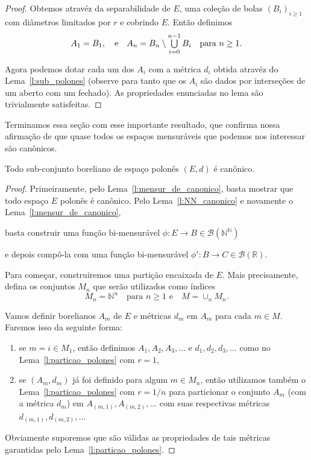 \begin{topics}
\begin{proof}
  Obtemos atravéz da separabilidade de $E$, uma coleção de bolas $(B_i)_{i \geq 1}$ com diâmetros limitados por $r$ e cobrindo $E$.
  Então definimos
  \begin{equation}
    A_1 = B_1, \quad \text{e} \quad A_n = B_n \setminus \operatorname*{{\textstyle \bigcup}}_{i=0}^{n-1} B_i \quad \text{para $n \geq 1$.}
  \end{equation}

  Agora podemos dotar cada um dos $A_i$ com a métrica $d_i$ obtida atravéz do Lema~\ref{l:sub_polones} (observe para tanto que os $A_i$ são dados por interseções de um aberto com um fechado).
  As propriedades enunciadas no lema são trivialmente satisfeitas.
\end{proof}

Terminamos essa seção com esse importante resultado, que confirma nossa afirmação de que quase todos os espaços mensuráveis que podemos nos interessar são canônicos.

\begin{theorem}
  Todo sub-conjunto boreliano de espaço polonês $(E, d)$ é canônico.
\end{theorem}

\begin{proof}
  Primeiramente, pelo Lema~\ref{l:mensur_de_canonico}, basta mostrar que todo espaço $E$ polonês é canônico.
  Pelo Lema~\ref{l:NN_canonico} e novamente o Lema~\ref{l:mensur_de_canonico},
  \begin{display}
    basta construir uma função bi-mensurável $\phi:E \to B \in \mathcal{B}(\mathbb{N}^\mathbb{N})$
  \end{display}
  e depois compô-la com uma função bi-mensurável $\phi': B \to C \in \mathcal{B}(\mathbb{R})$.

  Para começar, construiremos uma partição encaixada de $E$.
  Mais precisamente, defina os conjuntos $M_n$ que serão utilizados como índices
  \begin{equation}
    M_n = \mathbb{N}^n \quad \text{para $n \geq 1$ e} \quad M = \cup_n M_n.
  \end{equation}

  Vamos definir borelianos $A_m$ de $E$ e métricas $d_m$ em $A_m$ para cada $m \in M$.
  Faremos isso da seguinte forma:
  \begin{enumerate}[\quad a)]
  \item se $m = i \in M_1$, então definimos $A_1, A_2, A_3, \dots$ e $d_1, d_2, d_3, \dots$ como no Lema~\ref{l:particao_polones} com $r = 1$,
  \item se $(A_m, d_m)$ já foi definido para algum $m \in M_n$, então utilizamos também o Lema~\ref{l:particao_polones} com $r = 1/n$ para particionar o conjunto $A_m$ (com a métrica $d_m$) em $A_{(m,1)}, A_{(m,2)}, \dots$ com suas respectivas métricas $d_{(m,1)}, d_{(m,2)}, \dots$
  \end{enumerate}
  Obviamente suporemos que são válidas as propriedades de tais métricas garantidas pelo Lema~\ref{l:particao_polones}.


\end{proof}
\end{topics}

